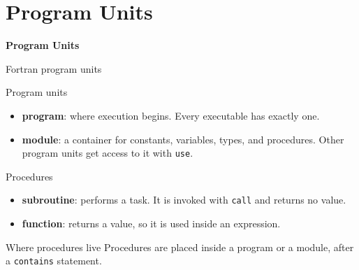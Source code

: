 
\subtitle{Lecture 4: Data Type Precision, Programs, Modules, and Procedures}



\begin{frame}
  \titlepage
\end{frame}



\section{Program Units}

\begin{frame}
  \centering
  \Huge \textbf{Program Units}
\end{frame}


\begin{frame}{Fortran program units}
  \begin{block}{Program units}
    \begin{itemize}
      \item \textbf{program}: where execution begins. Every executable has exactly one.
      \item \textbf{module}: a container for constants, variables, types, and procedures. Other program units get access to it with \texttt{use}.
    \end{itemize}
  \end{block}
  \begin{block}{Procedures}
    \begin{itemize}
      \item \textbf{subroutine}: performs a task. It is invoked with \texttt{call} and returns no value.
      \item \textbf{function}: returns a value, so it is used inside an expression.
    \end{itemize}
  \end{block}
  \begin{block}{Where procedures live}
    Procedures are placed inside a program or a module, after a \texttt{contains} statement.
  \end{block}
\end{frame}


